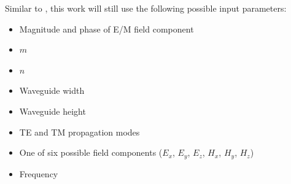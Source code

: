 \documentclass[conference]{IEEEtran}
\begin{document}
Similar to \cite{newberry_machine_2022}, this work will still use the following possible input parameters:

\begin{itemize}
	\item Magnitude and phase of E/M field component
	\item $m$
	\item $n$
	\item Waveguide width
	\item Waveguide height
	\item TE and TM propagation modes
	\item One of six possible field components ($E_x$, $E_y$, $E_z$, $H_x$, $H_y$, $H_z$)
	\item Frequency
\end{itemize}
\end{document}
